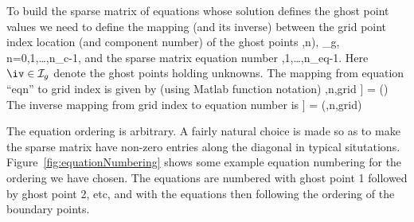 \documentclass{article}
\def\ba#1\ea{\begin{align}#1\end{align}}
\newcommand{\Ic}{\mathcal{I}}
\newcommand{\neqn}{{n_{\rm eq}}}
\newcommand{\nc}{n_{c}}
\newcommand{\Ig}{\Ic_g}
\newcommand{\eqn}{\text{eqn}}
\begin{document}
\bigskip
To build the sparse matrix of equations whose solution defines the ghost point values
we need to define the mapping (and its inverse) between the grid point index location (and component number)
of the ghost points 
\ba
(\iv,n), \qquad \iv\in\Ig, \quad n=0,1,\ldots,\nc-1, 
\ea
and the sparse matrix equation number
\ba
  \eqn=0,1,\ldots,\neqn-1.
\ea
Here $\iv\in\Ig$ denote the ghost points holding unknowns.
The mapping from equation ``$\eqn$'' to grid index is given by (using Matlab function notation)
\ba
    [ \iv,n,grid ] = \equationToIndex(\eqn)
\ea
The inverse mapping from grid index to equation number is
\ba
    [ \eqn ] = \indexToEquation(\iv,n,grid)
\ea

\newcommand{\labelSize}{\footnotesize}

The equation ordering is
arbitrary. A fairly natural choice is made so as to make the sparse matrix have non-zero entries along the diagonal in
typical situtations. 
Figure~\eqref{fig:equationNumbering} shows some example equation numbering for the ordering we have chosen.
The equations are numbered with ghost point 1 followed by ghost point 2, etc, and with the 
equations then following the ordering of the boundary points. 
\end{document}
